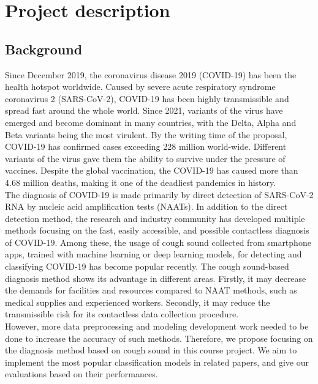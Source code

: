 \documentclass[11pt]{article}
\begin{document}
\section{Project description} %
\subsection{Background}
Since December 2019, the coronavirus disease 2019 (COVID-19) has been the health hotspot
worldwide. Caused by severe acute respiratory syndrome coronavirus 2 (SARS-CoV-2), COVID-19
 has been highly transmissible and spread fast around the whole world. Since 2021, variants
 of the virus have emerged and become dominant in many countries, with the Delta, Alpha and
 Beta variants being the most virulent. By the writing time of the proposal, COVID-19 has
  confirmed cases exceeding 228 million world-wide\cite{enwiki:1044966507}. Different variants of the virus gave
  them the ability to survive under the pressure of vaccines. Despite the global vaccination,
   the COVID-19 has caused more than  4.68 million deaths, making it one of the deadliest
   pandemics in history.\\

\noindent
The diagnosis of COVID-19 is made primarily by direct detection of SARS-CoV-2 RNA by nucleic acid amplification tests (NAATs). In addition to the direct detection method, the research and industry community has developed multiple methods focusing on the fast, easily accessible, and possible contactless diagnosis of COVID-19. Among these, the usage of cough sound collected from smartphone apps, trained with machine learning or deep learning models, for detecting and classifying COVID-19 has become popular recently\cite{PPR:PPR343330}. The cough sound-based
diagnosis method shows its advantage in different areas. Firstly, it may decrease the demands for facilities and resources compared to NAAT methods, such as medical supplies and experienced workers. Secondly, it may reduce the transmissible risk for its contactless data collection procedure. \\

\noindent
However, more data preprocessing and modeling development work needed to be done to increase the accuracy of such methods. Therefore, we propose focusing on the diagnosis method based on cough sound in this course project. We aim to implement the most popular classification
models in related papers, and give our evaluations based on their performances.
\end{document}

